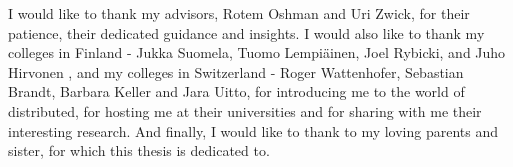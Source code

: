 I would like to thank my advisors, Rotem Oshman and Uri Zwick, for their patience, their dedicated guidance and insights. I would also like to thank my colleges in Finland - Jukka Suomela, Tuomo Lempiäinen, Joel Rybicki, and Juho Hirvonen , and my colleges in Switzerland - Roger Wattenhofer, Sebastian Brandt, Barbara Keller and Jara Uitto, for introducing me to the world of distributed, for hosting me at their universities and for sharing with me their interesting research. And finally, I would like to thank to my loving parents and sister, for which this thesis is dedicated to.

